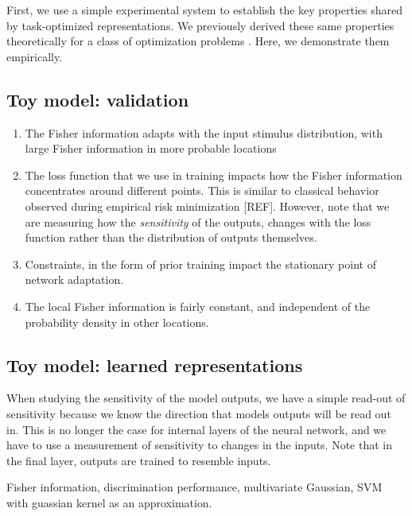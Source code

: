 \documentclass[10pt, twocolumn]{article}      %
\begin{document}
First, we use a simple experimental system to establish the key properties shared by task-optimized representations.
We previously derived these same properties theoretically for a class of optimization problems \cite{rast_adaptation_2020}.
Here, we demonstrate them empirically. 





\subsection{Toy model: validation}




\begin{enumerate}
  \item The Fisher information adapts with the input stimulus distribution, with large Fisher information in more probable locations
  \item The loss function that we use in training impacts how the Fisher information concentrates around different points. This is similar to classical behavior observed during empirical risk minimization [REF]. However, note that we are measuring how the \textit{sensitivity} of the outputs, changes with the loss function rather than the distribution of outputs themselves. 
  \item Constraints, in the form of prior training impact the stationary point of network adaptation.
  \item The local Fisher information is fairly constant, and independent of the probability density in other locations.
\end{enumerate}




\subsection{Toy model: learned representations}

When studying the sensitivity of the model outputs, we have a simple read-out of sensitivity because we know the direction that models outputs will be read out in.
This is no longer the case for internal layers of the neural network, and we have to use a measurement of sensitivity to changes in the inputs.
Note that in the final layer, outputs are trained to resemble inputs.

Fisher information, discrimination performance, multivariate Gaussian, SVM with guassian kernel as an approximation.
\end{document}
